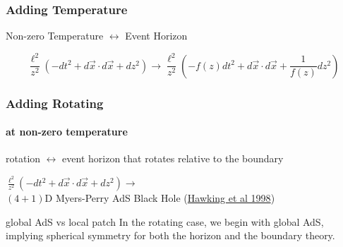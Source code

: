 \documentclass[aspectratio=169, xcolor=dvipsnames]{beamer}
\begin{document}
\begin{frame}
  \frametitle{Adding Temperature}

  \begin{block}{}Non-zero Temperature $\longleftrightarrow$ Event Horizon\end{block}

  $$\frac {\ell^2}{z^2} \left( -dt^2 + d\vec x\cdot d\vec x + dz^2 \right) \rightarrow \frac {\ell^2}{z^2} \left( -f(z) dt^2 + d\vec x\cdot d\vec x + \frac 1{f(z)}dz^2 \right)$$

  \begin{center}
  \end{center}
\end{frame}

\begin{frame}
  \frametitle{Adding Rotating}
  \framesubtitle{at non-zero temperature}

  \begin{block}{}rotation $\longleftrightarrow$ event horizon that rotates relative to the boundary\end{block}

  \begin{block}{}
    $\frac {\ell^2}{z^2} \left( -dt^2 + d\vec x\cdot d\vec x + dz^2 \right) \rightarrow$ \\$(4+1)$D Myers-Perry AdS Black Hole (\href{https://inspirehep.net/literature/478927}{Hawking et al 1998})
  \end{block}

  \begin{alertblock}{global AdS vs local patch}
    In the rotating case, we begin with global AdS, implying spherical symmetry for both the horizon and the boundary theory.
  \end{alertblock}


\end{frame}
\end{document}

